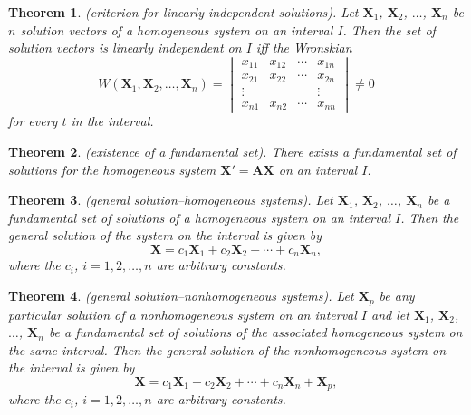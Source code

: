 \documentclass{article}
\theoremstyle{plain}
\newtheorem{thm}{Theorem}[section]
\theoremstyle{definition}
\theoremstyle{remark}
\begin{document}
\begin{thm} (criterion for linearly independent solutions).
    Let \(\mathbf{X}_1\), \(\mathbf{X}_2\), \(\ldots\), \(\mathbf{X}_n\) be \(n\) solution vectors of a homogeneous system on an interval \(I\). Then the set of solution vectors is linearly independent on \(I\) iff the Wronskian
    \begin{equation}
        W(\mathbf{X}_1, \mathbf{X}_2, \ldots, \mathbf{X}_n) = \begin{vmatrix}
            x_{11} & x_{12} & \cdots & x_{1n}\\
            x_{21} & x_{22} & \cdots & x_{2n}\\
            \vdots & & & \vdots\\
            x_{n1} & x_{n2} & \cdots & x_{nn} 
        \end{vmatrix} \neq 0
    \end{equation}
    \noindent for every \(t\) in the interval.
\end{thm}

\begin{thm} (existence of a fundamental set).
    There exists a fundamental set of solutions for the homogeneous system \(\mathbf{X'} = \mathbf{AX}\) on an interval \(I\).
\end{thm}

\begin{thm} (general solution--homogeneous systems).
    Let \(\mathbf{X}_1\), \(\mathbf{X}_2\), \(\ldots\), \(\mathbf{X}_n\) be a fundamental set of solutions of a homogeneous system on an interval \(I\). Then the \emph{general solution} of the system on the interval is given by
    \begin{equation}
        \mathbf{X} = c_1\mathbf{X}_1 + c_2\mathbf{X}_2 + \cdots + c_n\mathbf{X}_n,
    \end{equation}
    \noindent where the \(c_i\), \(i = 1, 2, \ldots, n\) are arbitrary constants.
\end{thm}

\begin{thm} (general solution--nonhomogeneous systems).
    Let \(\mathbf{X}_p\) be any particular solution of a nonhomogeneous system on an interval \(I\) and let \(\mathbf{X}_1\), \(\mathbf{X}_2\), \(\ldots\), \(\mathbf{X}_n\) be a fundamental set of solutions of the associated homogeneous system on the same interval. Then the \emph{general solution} of the nonhomogeneous system on the interval is given by
    \begin{equation}
        \mathbf{X} = c_1\mathbf{X}_1 + c_2\mathbf{X}_2 + \cdots + c_n\mathbf{X}_n + \mathbf{X}_p,
    \end{equation}
    \noindent where the \(c_i\), \(i = 1, 2, \ldots, n\) are arbitrary constants.
\end{thm}
\end{document}
